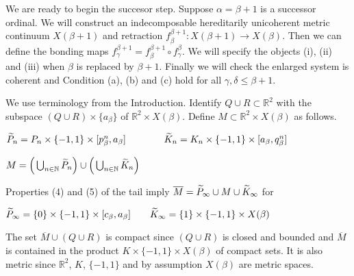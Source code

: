 \documentclass[12pt]{article}
\theoremstyle{plain}
\theoremstyle{definition}
\newcommand{\A}{\ensuremath{\alpha}}
\newcommand{\B}{\ensuremath{\beta}}
\newcommand{\G}{\ensuremath{\gamma}}
\newcommand{\D}{\ensuremath{\delta}}
\newcommand{\RR}{\ensuremath{\mathbb R}}
\newcommand{\NN}{\ensuremath{\mathbb N}}
\newcommand{\0}{\ensuremath{\varnothing}}
\newcommand{\wt}{\ensuremath{\widetilde}}
\begin{document}
	We are ready to begin the succesor step. Suppose $\A = \B+1$ is a successor ordinal. We will construct an indecomposable hereditarily unicoherent metric continuum $X(\B+1)$ and retraction $f^{\B+1}_\B: X(\B+1) \to X(\B)$. Then we can define the bonding maps $f^{\B+1}_\G = f^{\B+1}_\B  \circ f^{\B}_\G $.
	We will specify the objects (i), (ii) and (iii) when $\B$ is replaced by $\B+1$. Finally we will check the enlarged system is coherent and Condition (a), (b) and (c) hold for all $\G,\D \le \B+1$.
	
	We use terminology from the Introduction.
	Identify $Q \cup R \subset \RR^2$ with the subspace $(Q \cup R) \times \{a_\B\}$ of $\RR^2 \times X(\B)$.
	Define $M \subset \RR^2 \times X(\B)$ as follows.
	
	
	\begin{center}
		$\wt  P_n = P_n \times \{-1,1\} \times [p^n_\B, a_\B] \qquad \qquad \wt  K_n = K_n \times \{-1,1\} \times [a_\B, q^n_\B]$ 
	\end{center}
	
	\begin{center} 
		$  M = \Big ( \bigcup_{n \in \NN} \wt  P_n  \Big ) \cup \Big ( \bigcup_{n \in \NN} \wt  K_n  \Big ) $
	\end{center}
	Properties (4) and (5) of the tail imply  $\overline M =  \wt P_\infty \cup M \cup \wt K_\infty$ for 
	
	\vspace{2mm}
	
	\begin{center}
		$\wt  P_\infty =  \{0\} \times \{-1,1\} \times [c_\B,a_\B] \qquad \wt K_\infty = \{1\} \times \{-1,1\} \times X(\B) $ 
	\end{center}  
	
	
	\vspace{2mm}
	
	The set $\overline M \cup (Q \cup R)$ is compact since $(Q\cup R)$ is closed and bounded
	and $\overline M$ is contained in the product $ K \times \{-1,1\} \times X(\B)$ of compact sets.
	It is also metric since $\RR^2$, $K$, $\{-1,1\}$ and by assumption $X(\B)$ are metric spaces.
	
\end{document}

